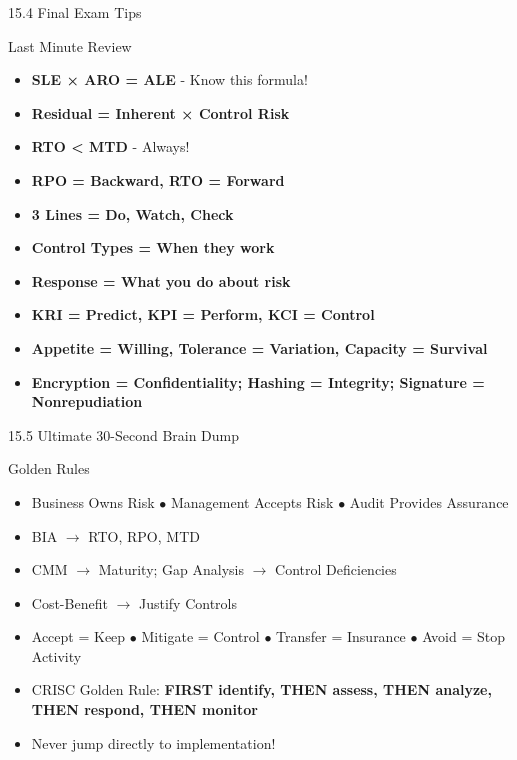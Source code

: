 \documentclass{beamer}
\begin{document}
	\begin{frame}{15.4 Final Exam Tips}
		\begin{block}{Last Minute Review}
			\begin{itemize}
				\item \textbf{SLE × ARO = ALE} - Know this formula!
				\item \textbf{Residual = Inherent × Control Risk}
				\item \textbf{RTO < MTD} - Always!
				\item \textbf{RPO = Backward, RTO = Forward}
				\item \textbf{3 Lines = Do, Watch, Check}
				\item \textbf{Control Types = When they work}
				\item \textbf{Response = What you do about risk}
				\item \textbf{KRI = Predict, KPI = Perform, KCI = Control}
				\item \textbf{Appetite = Willing, Tolerance = Variation, Capacity = Survival}
				\item \textbf{Encryption = Confidentiality; Hashing = Integrity; Signature = Nonrepudiation}
			\end{itemize}
		\end{block}
	\end{frame}
	
	\begin{frame}{15.5 Ultimate 30-Second Brain Dump}
		\begin{block}{Golden Rules}
			\begin{itemize}
				\item Business Owns Risk $\bullet$ Management Accepts Risk $\bullet$ Audit Provides Assurance
				\item BIA $\rightarrow$ RTO, RPO, MTD
				\item CMM $\rightarrow$ Maturity; Gap Analysis $\rightarrow$ Control Deficiencies
				\item Cost-Benefit $\rightarrow$ Justify Controls
				\item Accept = Keep $\bullet$ Mitigate = Control $\bullet$ Transfer = Insurance $\bullet$ Avoid = Stop Activity
				\item CRISC Golden Rule: \textbf{FIRST identify, THEN assess, THEN analyze, THEN respond, THEN monitor}
				\item Never jump directly to implementation!
			\end{itemize}
		\end{block}
	\end{frame}
	
\end{document}
